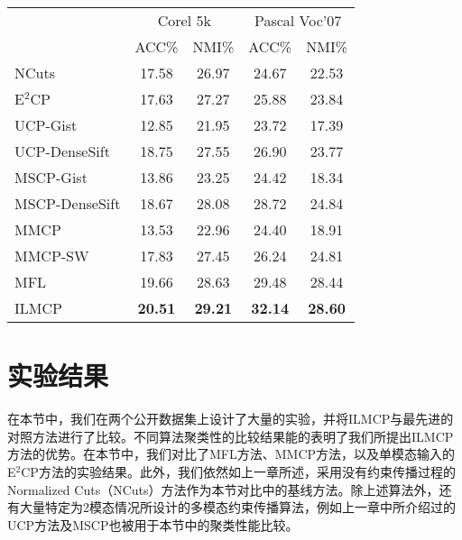 \begin{table}[h]
	\label{tab4:2modal_notag}
	
	\centering
	\setlength{\tabcolsep}{15pt}
	\begin{tabular}{lcccc}
		\toprule
		&\multicolumn{2}{c}{Corel 5k} & \multicolumn{2}{c}{Pascal Voc'07} \\
		\cmidrule(lr){2-3}
		\cmidrule(lr){4-5}
		& ACC\% & NMI\% & ACC\% & NMI\% \\
		\midrule
		NCuts & 17.58 & 26.97 & 24.67 & 22.53 \\ 
		E$^2$CP & 17.63 & 27.27 & 25.88 & 23.84 \\ 
		UCP-Gist & 12.85 & 21.95 & 23.72 & 17.39 \\ 
		UCP-DenseSift & 18.75 & 27.55 & 26.90 & 23.77 \\ 
		MSCP-Gist & 13.86 & 23.25 & 24.42 & 18.34 \\ 
		MSCP-DenseSift & 18.67 & 28.08 & 28.72 & 24.84 \\ 
		MMCP & 13.53 & 22.96 & 24.40 & 18.91 \\ 
		MMCP-SW & 17.83 & 27.45 & 26.24 & 24.81 \\ 
		MFL & 19.66 & 28.63 & 29.48 & 28.44 \\ 
		ILMCP & \textbf{20.51} & \textbf{29.21} & \textbf{32.14} & \textbf{28.60} \\ 
		\bottomrule
	\end{tabular}
\end{table}

\section{实验结果}
 在本节中，我们在两个公开数据集上设计了大量的实验，并将ILMCP与最先进的对照方法进行了比较。不同算法聚类性的比较结果能的表明了我们所提出ILMCP方法的优势。在本节中，我们对比了MFL方法、MMCP\cite{fu2011multi}方法，以及单模态输入的E$^2$CP\cite{lu2010constrained}方法的实验结果。此外，我们依然如上一章所述，采用没有约束传播过程的Normalized Cuts（NCuts）\cite{shi2000normalized}方法作为本节对比中的基线方法。除上述算法外，还有大量特定为2模态情况所设计的多模态约束传播算法，例如上一章中所介绍过的UCP\cite{lu2013unified}方法及MSCP\cite{lu2013exhaustive}也被用于本节中的聚类性能比较。

